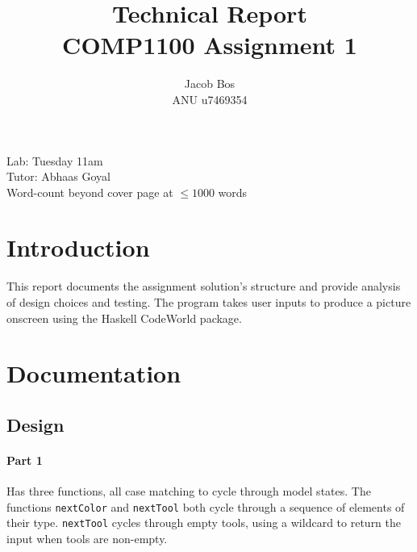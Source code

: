 \documentclass[11pt]{article}
\title{Technical Report\\ COMP1100 Assignment 1}
\author{Jacob Bos\\ ANU u7469354}
\begin{document}
\maketitle
{}
\begin{center}
  Lab: Tuesday 11am\\
  Tutor: Abhaas Goyal\\
  Word-count beyond cover page at $\leq 1000$ words
\end{center}
\tableofcontents
\newpage
{}
\section*{Introduction} 
This report documents the assignment solution's structure and provide analysis of design choices and testing. The program takes user inputs to produce a picture onscreen using the Haskell CodeWorld package. %


\section{Documentation}%
\subsection{Design}
\paragraph{Part 1} Has three functions, all case matching to cycle through model states. The functions \verb|nextColor| and  \verb|nextTool| both cycle through a sequence of elements of their type.  \verb|nextTool| cycles through empty tools, using a wildcard to return the input when tools are non-empty. %
\end{document}
